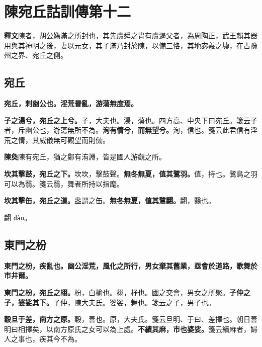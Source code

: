 \chapter{陳宛丘詁訓傳第十二}

\begin{quoting}\textbf{釋文}陳者，胡公媯滿之所封也，其先虞舜之冑有虞遏父者，為周陶正，武王賴其器用與其神明之後，妻以元女，其子滿乃封於陳，以備三恪，其地宓羲之墟，在古豫州之界、宛丘之側。\end{quoting}

\section{宛丘}


\textbf{宛丘，刺幽公也。淫荒昬亂，游蕩無度焉。}

\textbf{子之湯兮，宛丘之上兮。}{\footnotesize 子，大夫也。湯，蕩也。四方高、中央下曰宛丘。箋云子者，斥幽公也，游蕩無所不為。}\textbf{洵有情兮，而無望兮。}{\footnotesize 洵，信也。箋云此君信有淫荒之情，其威儀無可觀望而則俲。}

\begin{quoting}\textbf{陳奐}陳有宛丘，猶之鄭有洧淵，皆是國人游觀之所。\end{quoting}

\textbf{坎其擊鼓，宛丘之下。}{\footnotesize 坎坎，擊鼓聲。}\textbf{無冬無夏，值其鷺羽。}{\footnotesize 值，持也。鷺鳥之羽可以為翳。箋云翳，舞者所持以指麾。}

\textbf{坎其擊缶，宛丘之道。}{\footnotesize 盎謂之缶。}\textbf{無冬無夏，值其鷺翿。}{\footnotesize 翿，翳也。}

\begin{quoting}翿 \texttt{dào}。\end{quoting}

\section{東門之枌}


\textbf{東門之枌，疾亂也。幽公淫荒，風化之所行，男女棄其舊業，亟會於道路，歌舞於市井爾。}

\textbf{東門之枌，宛丘之栩。}{\footnotesize 枌，白榆也。栩，杼也。國之交會，男女之所聚。}\textbf{子仲之子，婆娑其下。}{\footnotesize 子仲，陳大夫氏。婆娑，舞也。箋云之子，男子也。}

\textbf{穀旦于差，南方之原。}{\footnotesize 穀，善也。原，大夫氏。箋云旦明、于曰、差擇也。朝日善明曰相擇矣，以南方原氏之女可以為上處。}\textbf{不績其麻，市也婆娑。}{\footnotesize 箋云績麻者，婦人之事也，疾其今不為。}

